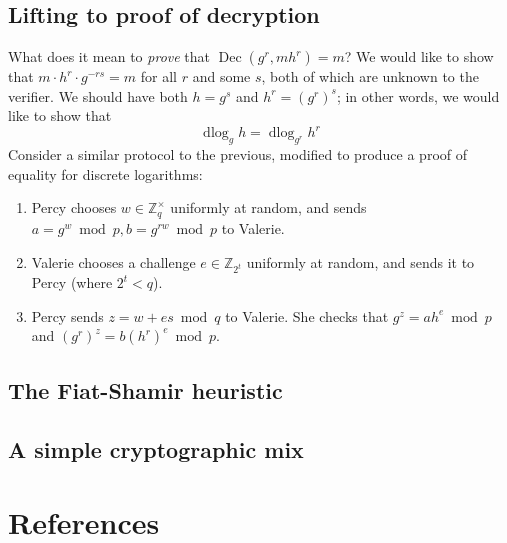 \documentclass[11pt,twoside,a4paper]{article}
\DeclareMathOperator{\Dec}{Dec}
\DeclareMathOperator{\dlog}{dlog}
\theoremstyle{definition}
\begin{document}
\subsection{Lifting to proof of decryption}
What does it mean to \textit{prove} that \(\Dec(g^r,mh^r)=m\)? We would like to show that \(m\cdot h^r\cdot g^{-rs}=m\) for all \(r\) and some \(s\), both of which are unknown to the verifier. We should have both \(h=g^s\) and \(h^r=(g^r)^s\); in other words, we would like to show that
\[\dlog_g{h}=\dlog_{g^r}{h^r}\]
Consider a similar protocol to the previous, modified to produce a proof of equality for discrete logarithms:
\begin{enumerate}
    \item Percy chooses \(w\in\mathbb{Z}^\times_q\) uniformly at random, and sends \(a=g^w\bmod p,b=g^{rw}\bmod p\) to Valerie.
    \item Valerie chooses a challenge \(e\in\mathbb{Z}_{2^t}\) uniformly at random, and sends it to Percy (where \(2^t<q\)).
    \item Percy sends \(z=w+es\bmod q\) to Valerie. She checks that \(g^z=ah^e\bmod p\) and \((g^r)^z=b(h^r)^e\bmod p\).
\end{enumerate}
\subsection{The Fiat-Shamir heuristic}
\subsection{A simple cryptographic mix}
\vfill\pagebreak
\section{References}


\end{document}
